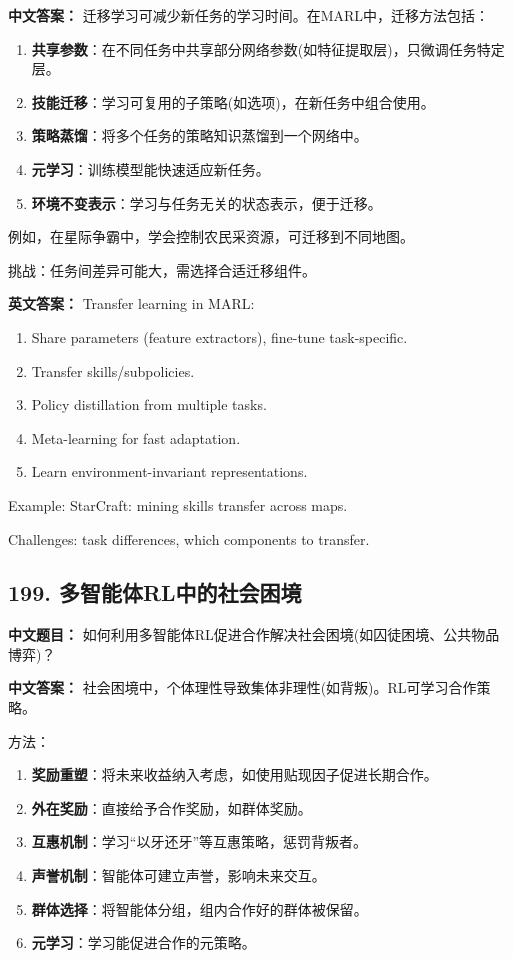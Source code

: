 \documentclass[10pt,a4paper]{ctexart}
\begin{document}
\textbf{中文答案：}  
迁移学习可减少新任务的学习时间。在MARL中，迁移方法包括：

\begin{enumerate}
    \item \textbf{共享参数}：在不同任务中共享部分网络参数(如特征提取层)，只微调任务特定层。
    \item \textbf{技能迁移}：学习可复用的子策略(如选项)，在新任务中组合使用。
    \item \textbf{策略蒸馏}：将多个任务的策略知识蒸馏到一个网络中。
    \item \textbf{元学习}：训练模型能快速适应新任务。
    \item \textbf{环境不变表示}：学习与任务无关的状态表示，便于迁移。
\end{enumerate}

例如，在星际争霸中，学会控制农民采资源，可迁移到不同地图。

挑战：任务间差异可能大，需选择合适迁移组件。

\textbf{英文答案：}  
Transfer learning in MARL:

\begin{enumerate}
    \item Share parameters (feature extractors), fine-tune task-specific.
    \item Transfer skills/subpolicies.
    \item Policy distillation from multiple tasks.
    \item Meta-learning for fast adaptation.
    \item Learn environment-invariant representations.
\end{enumerate}

Example: StarCraft: mining skills transfer across maps.

Challenges: task differences, which components to transfer.

\subsection*{199. 多智能体RL中的社会困境}
\textbf{中文题目：} 如何利用多智能体RL促进合作解决社会困境(如囚徒困境、公共物品博弈)？

\textbf{中文答案：}  
社会困境中，个体理性导致集体非理性(如背叛)。RL可学习合作策略。

方法：
\begin{enumerate}
    \item \textbf{奖励重塑}：将未来收益纳入考虑，如使用贴现因子促进长期合作。
    \item \textbf{外在奖励}：直接给予合作奖励，如群体奖励。
    \item \textbf{互惠机制}：学习“以牙还牙”等互惠策略，惩罚背叛者。
    \item \textbf{声誉机制}：智能体可建立声誉，影响未来交互。
    \item \textbf{群体选择}：将智能体分组，组内合作好的群体被保留。
    \item \textbf{元学习}：学习能促进合作的元策略。
\end{enumerate}
\end{document}

